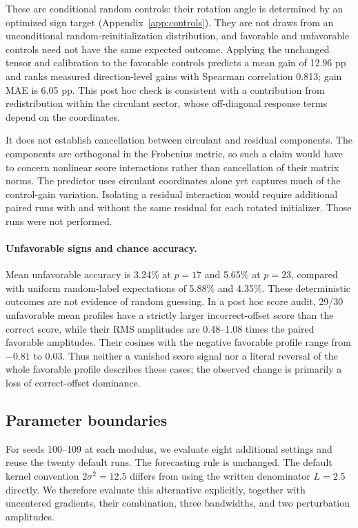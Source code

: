 \documentclass[11pt]{article}
\begin{document}
These are conditional random controls: their rotation angle is determined by an optimized sign target (Appendix~\ref{app:controls}). They are not draws from an unconditional random-reinitialization distribution, and favorable and unfavorable controls need not have the same expected outcome. Applying the unchanged tensor and calibration to the favorable controls predicts a mean gain of 12.96 pp and ranks measured direction-level gains with Spearman correlation 0.813; gain MAE is 6.05 pp. This post hoc check is consistent with a contribution from redistribution within the circulant sector, whose off-diagonal response terms depend on the coordinates.

It does not establish cancellation between circulant and residual components. The components are orthogonal in the Frobenius metric, so such a claim would have to concern nonlinear score interactions rather than cancellation of their matrix norms. The predictor uses circulant coordinates alone yet captures much of the control-gain variation. Isolating a residual interaction would require additional paired runs with and without the same residual for each rotated initializer. Those runs were not performed.

\paragraph{Unfavorable signs and chance accuracy.}
Mean unfavorable accuracy is 3.24\% at $p=17$ and 5.65\% at $p=23$, compared with uniform random-label expectations of 5.88\% and 4.35\%. These deterministic outcomes are not evidence of random guessing. In a post hoc score audit, 29/30 unfavorable mean profiles have a strictly larger incorrect-offset score than the correct score, while their RMS amplitudes are 0.48--1.08 times the paired favorable amplitudes. Their cosines with the negative favorable profile range from $-0.81$ to 0.03. Thus neither a vanished score signal nor a literal reversal of the whole favorable profile describes these cases; the observed change is primarily a loss of correct-offset dominance.

\subsection{Parameter boundaries}
For seeds 100--109 at each modulus, we evaluate eight additional settings and reuse the twenty default runs. The forecasting rule is unchanged. The default kernel convention $2\sigma^2=12.5$ differs from using the written denominator $L=2.5$ directly. We therefore evaluate this alternative explicitly, together with uncentered gradients, their combination, three bandwidths, and two perturbation amplitudes.
\end{document}
